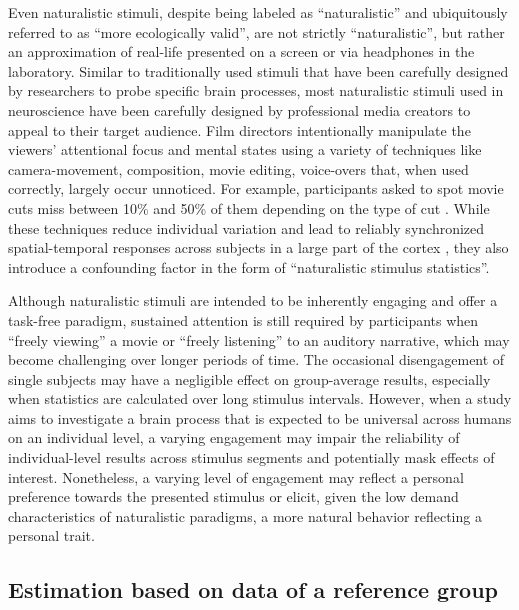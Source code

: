 %
Even naturalistic stimuli, despite being labeled as ``naturalistic''
and ubiquitously referred to as ``more ecologically valid'', are not strictly
``naturalistic'', but rather an approximation of real-life presented on a screen
or via headphones in the laboratory.
Similar to traditionally used stimuli that have been carefully designed by
researchers to probe specific brain processes, most naturalistic stimuli used in
neuroscience have been carefully designed by professional media creators to
appeal to their target audience.
%
Film directors intentionally manipulate the viewers' attentional focus and
mental states using a variety of techniques like camera-movement, composition,
movie editing, voice-overs \citep{brown2012cinematography,
dancyger2011film-technique, katz1991film, mercado2011filmmakers} that, when used
correctly, largely occur unnoticed.
%
For example, participants asked to spot movie cuts miss between 10\% and 50\% of
them depending on the type of cut \citep{smith2008edit}.
%
While these techniques reduce individual variation and lead to reliably
synchronized spatial-temporal responses across subjects in a large part of the
cortex \citep{hasson2008neurocinematics}, they also introduce a confounding
factor in the form of ``naturalistic stimulus statistics''.

%
Although naturalistic stimuli are intended to be inherently engaging and offer a
task-free paradigm, sustained attention is still required by participants when
``freely viewing'' a movie or ``freely listening'' to an auditory narrative,
which may become challenging over longer periods of time.
%
The occasional disengagement of single subjects may have a negligible effect on
group-average results, especially when statistics are calculated over long
stimulus intervals.
%
However, when a study aims to investigate a brain process that is expected to be
universal across humans on an individual level, a varying engagement may impair
the reliability of individual-level results across stimulus segments and
potentially mask effects of interest.
%
Nonetheless, a varying level of engagement may reflect a personal preference
towards the presented stimulus or elicit, given the low demand characteristics
\citep[cf.][]{orne1962social} of naturalistic paradigms, a more natural behavior
reflecting a personal trait.


\subsection{Estimation based on data of a reference group}

